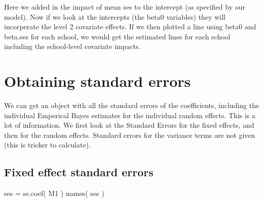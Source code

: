 \documentclass[
  letterpaper,
  DIV=11,
  numbers=noendperiod]{scrreprt}
\newenvironment{Shaded}{}{}
\newcommand{\AttributeTok}[1]{\textcolor[rgb]{0.49,0.56,0.16}{#1}}
\newcommand{\ConstantTok}[1]{\textcolor[rgb]{0.53,0.00,0.00}{#1}}
\newcommand{\FunctionTok}[1]{\textcolor[rgb]{0.02,0.16,0.49}{#1}}
\newcommand{\NormalTok}[1]{#1}
\newcommand{\OtherTok}[1]{\textcolor[rgb]{0.00,0.44,0.13}{#1}}
\newcommand{\SpecialCharTok}[1]{\textcolor[rgb]{0.25,0.44,0.63}{#1}}
\newcommand{\StringTok}[1]{\textcolor[rgb]{0.25,0.44,0.63}{#1}}
\begin{document}
\begin{Shaded}
\end{Shaded}

Here we added in the impact of mean ses to the intercept (as specified
by our model). Now if we look at the intercepts (the beta0 variables)
they will incorperate the level 2 covariate effects. If we then plotted
a line using beta0 and beta.ses for each school, we would get the
estimated lines for each school including the school-level covariate
impacts.

\section{Obtaining standard errors}\label{obtaining-standard-errors}

We can get an object with all the standard errors of the coefficients,
including the individual Emperical Bayes estimates for the individual
random effects. This is a lot of information. We first look at the
Standard Errors for the fixed effects, and then for the random effects.
Standard errors for the variance terms are not given (this is tricker to
calculate).

\subsection{Fixed effect standard
errors}\label{fixed-effect-standard-errors}

\begin{Shaded}
\begin{Highlighting}[]
\NormalTok{ses }\OtherTok{=} \FunctionTok{se.coef}\NormalTok{( M1 )}
\FunctionTok{names}\NormalTok{( ses )}
\end{Highlighting}
\end{Shaded}
\end{document}
